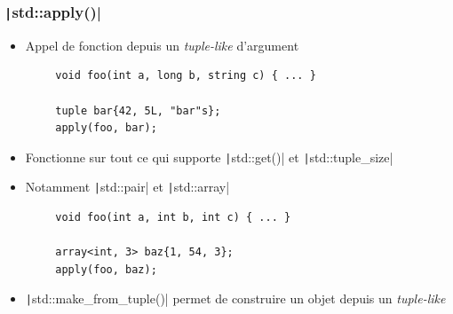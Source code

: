 \documentclass[C++.tex]{subfiles}
\begin{document}
\begin{frame}[fragile]
	\frametitle{\texttt|std::apply()|}
	\begin{itemize}
		\item Appel de fonction depuis un \textit{tuple-like} d'argument
	\end{itemize}

	\begin{verbatim}
		void foo(int a, long b, string c) { ... }

		tuple bar{42, 5L, "bar"s};
		apply(foo, bar);
	\end{verbatim}

	\begin{itemize}
		\item Fonctionne sur tout ce qui supporte \texttt|std::get()| et \texttt|std::tuple_size|
		\item Notamment \texttt|std::pair| et \texttt|std::array|
	\end{itemize}

	\begin{verbatim}
		void foo(int a, int b, int c) { ... }

		array<int, 3> baz{1, 54, 3};
		apply(foo, baz);
	\end{verbatim}

	\begin{itemize}
		\item \texttt|std::make_from_tuple()| permet de construire un objet depuis un \textit{tuple-like}
	\end{itemize}


\end{frame}
\end{document}

